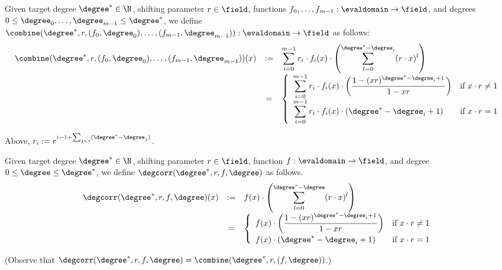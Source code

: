 \begin{definition}\label{def:combine}
    Given target degree $\degree^*\in\N$, shifting parameter $r\in\field$, functions $f_0,\ldots,f_{m-1}:\evaldomain\rightarrow\field$, and degrees $0\leq \degree_0,\ldots,\degree_{m-1}\leq {\degree}^*$, we define $\combine(\degree^*,r,(f_0,\degree_0),\ldots,(f_{m-1},\degree_{m-1})):\evaldomain\rightarrow\field$ as follows:
        \[
        \begin{array}{rcl}
        \combine(\degree^*, r, (f_0, \degree_0), \ldots, (f_{m-1}, \degree_{m-1}))(x)
        & := & \displaystyle\sum_{i=0}^{m-1} r_i \cdot f_i(x) \cdot \left( \sum_{l=0}^{\degree^* - \degree_i} (r \cdot x)^l \right) \\[10pt]
        & = & \left\{
        \begin{array}{ll}
            \displaystyle\sum_{i=0}^{m-1} r_i \cdot f_i(x) \cdot \left( \dfrac{1 - (x r)^{\degree^* - \degree_i + 1}}{1 - x r} \right)
            & \text{if } x \cdot r \neq 1 \\[8pt]
            \displaystyle\sum_{i=0}^{m-1} r_i \cdot f_i(x) \cdot (\degree^* - \degree_i + 1)
            & \text{if } x \cdot r = 1
        \end{array}
        \right.
        \end{array}
        \]

Above, $r_i:=r^{i-1+\sum_{j<i}(\degree^*-\degree_j)}$.
\end{definition}

\begin{definition}\label{def:deg_corr}
    Given target degree $\degree^*\in\N$, shifting parameter $r\in\field$, function $f:\evaldomain\rightarrow\field$, and degree $0\leq\degree\leq\degree^*$, we define $\degcorr(\degree^*,r,f,\degree)$ as follows.
    \[
    \begin{array}{rcl}
    \degcorr(\degree^*, r, f, \degree)(x)
    & := & \displaystyle f(x) \cdot \left( \sum_{l=0}^{\degree^* - \degree} (r \cdot x)^l \right) \\[10pt]
    & = & \left\{
    \begin{array}{ll}
        \displaystyle f(x) \cdot \left( \dfrac{1 - (x r)^{\degree^* - \degree_i + 1}}{1 - x r} \right)
        & \text{if } x \cdot r \neq 1 \\[8pt]
        \displaystyle f(x) \cdot (\degree^* - \degree_i + 1)
        & \text{if } x \cdot r = 1
    \end{array}
    \right.
    \end{array}
    \]


(Observe that $\degcorr(\degree^*,r,f,\degree)=\combine(\degree^*,r,(f,\degree))$.)
\end{definition}

